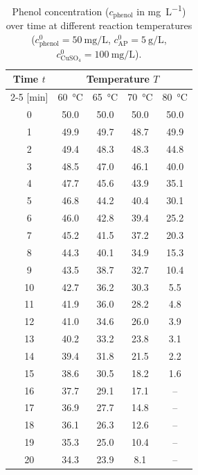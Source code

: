 \begin{table}[htbp]
    \centering
    \caption{Phenol concentration ($c_{\text{phenol}}$ in \si{\milli\gram\per\liter}) over time at different reaction temperatures ($c^0_{\text{phenol}} = \SI{50}{\milli\gram\per\liter}$, $c^0_{\text{AP}} = \SI{5}{\gram\per\liter}$, $c^0_{\mathrm{CuSO_4}} = \SI{100}{\milli\gram\per\liter}$).}
    \label{tab:task1_temperature}
    \begin{tabular}{ccccc}
        \toprule
        \textbf{Time} $t$ & \multicolumn{4}{c}{Temperature $T$} \\
        \cmidrule{2-5}
        {[\si{\minute}]} & \SI{60}{\degreeCelsius} & \SI{65}{\degreeCelsius} & \SI{70}{\degreeCelsius} & \SI{80}{\degreeCelsius} \\
        \midrule
        0  & 50.0 & 50.0 & 50.0 & 50.0 \\
        1  & 49.9 & 49.7 & 48.7 & 49.9 \\
        2  & 49.4 & 48.3 & 48.3 & 44.8 \\
        3  & 48.5 & 47.0 & 46.1 & 40.0 \\
        4  & 47.7 & 45.6 & 43.9 & 35.1 \\
        5  & 46.8 & 44.2 & 40.4 & 30.1 \\
        6  & 46.0 & 42.8 & 39.4 & 25.2 \\
        7  & 45.2 & 41.5 & 37.2 & 20.3 \\
        8  & 44.3 & 40.1 & 34.9 & 15.3 \\
        9  & 43.5 & 38.7 & 32.7 & 10.4 \\
        10 & 42.7 & 36.2 & 30.3 & 5.5 \\
        11 & 41.9 & 36.0 & 28.2 & 4.8 \\
        12 & 41.0 & 34.6 & 26.0 & 3.9 \\
        13 & 40.2 & 33.2 & 23.8 & 3.1 \\
        14 & 39.4 & 31.8 & 21.5 & 2.2 \\
        15 & 38.6 & 30.5 & 18.2 & 1.6 \\
        16 & 37.7 & 29.1 & 17.1 & --  \\
        17 & 36.9 & 27.7 & 14.8 & --  \\
        18 & 36.1 & 26.3 & 12.6 & --  \\
        19 & 35.3 & 25.0 & 10.4 & --  \\
        20 & 34.3 & 23.9 & 8.1  & --  \\
        \bottomrule
    \end{tabular}
\end{table}

